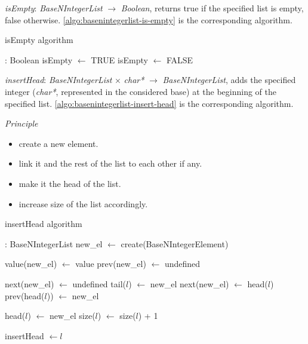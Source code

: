 \documentclass[book, nodocumentinfo]{upmethodology-document}
\begin{document}

\emph{isEmpty}: \emph{BaseNIntegerList} \(\rightarrow\) \emph{Boolean},
returns true if the specified list is empty, false otherwise.
\ref{algo:basenintegerlist-is-empty} is the corresponding algorithm.

\begin{algorithm}[H]
    \label{algo:basenintegerlist-is-empty}
    \caption{isEmpty algorithm}

    \begin{algorithmic}
         : Boolean
                \State isEmpty \(\leftarrow\) TRUE
            \Else
                \State isEmpty \(\leftarrow\) FALSE
            \EndIf
        \EndFunction
    \end{algorithmic}
\end{algorithm}


\emph{insertHead}: \emph{BaseNIntegerList} \(\times\) \emph{char*} \(\rightarrow\) \emph{BaseNIntegerList},
adds the specified integer (\emph{char*}, represented in the considered base) at the beginning
of the specified list.
\ref{algo:basenintegerlist-insert-head} is the corresponding algorithm.

\emph{Principle}
\begin{itemize}
    \item create a new element.
    \item link it and the rest of the list to each other if any.
    \item make it the head of the list.
    \item increase size of the list accordingly.
\end{itemize}

\begin{algorithm}[H]
    \label{algo:basenintegerlist-insert-head}
    \caption{insertHead algorithm}

    \begin{algorithmic}
         : BaseNIntegerList
            \State new\_el \(\leftarrow\) create(BaseNIntegerElement)

            \State value(new\_el) \(\leftarrow\) value
            \State prev(new\_el) \(\leftarrow\) undefined

                \State next(new\_el) \(\leftarrow\) undefined
                \State tail(\(l\)) \(\leftarrow\) new\_el
            \Else
                \State next(new\_el) \(\leftarrow\) head(\(l\))
                \State prev(head(\(l\))) \(\leftarrow\) new\_el
            \EndIf

            \State head(\(l\)) \(\leftarrow\) new\_el
            \State size(\(l\)) \(\leftarrow\) size(\(l\)) + 1

            \State insertHead \(\leftarrow l\)
        \EndFunction
    \end{algorithmic}
\end{algorithm}
\end{document}
